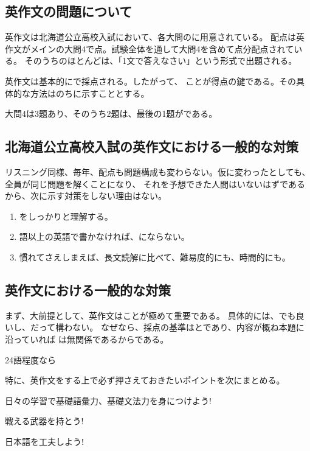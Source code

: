 \subsection{英作文の問題について}
    英作文は北海道公立高校入試において、各大問のに用意されている。
    配点は英作文がメインの大問4で点。試験全体を通して大問4を含めて点分配点されている。
    そのうちのほとんどは、「1文で答えなさい」という形式で出題される。

    英作文は基本的にで採点される。したがって、
    ことが得点の鍵である。その具体的な方法はのちに示すこととする。

    大問4は3題あり、そのうち2題は、最後の1題がである。

\subsection{北海道公立高校入試の英作文における一般的な対策}
    リスニング同様、毎年、配点も問題構成も変わらない。仮に変わったとしても、全員が同じ問題を解くことになり、
    それを予想できた人間はいないはずであるから、次に示す対策をしない理由はない。

    \begin{enumerate}
        \item {}をしっかりと理解する。
        \item {}語以上の英語で書かなければ、にならない。
        \item 慣れてさえしまえば、長文読解に比べて、難易度的にも、時間的にも。
    \end{enumerate}

\subsection{英作文における一般的な対策}
    まず、大前提として、英作文はことが極めて重要である。
    具体的には、でも良いし、だって構わない。
    なぜなら、採点の基準はとであり、内容が概ね本題に沿っていれば
    は無関係であるからである。

    24語程度なら

    特に、英作文をする上で必ず押さえておきたいポイントを次にまとめる。
\newpage

        \begin{techniquebox}{日々の学習で基礎語彙力、基礎文法力を身につけよう!}

        \end{techniquebox}
\vspace{1em}

        \begin{techniquebox}{戦える武器を持とう!}

        \end{techniquebox}
\vspace{1em}

        \begin{techniquebox}{日本語を工夫しよう!}

        \end{techniquebox}
\vspace{1em}
